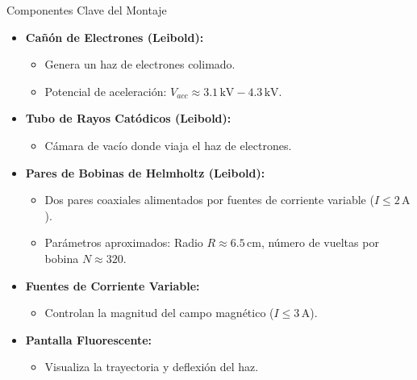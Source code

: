 \documentclass{beamer}
\begin{document}
\begin{frame}{Componentes Clave del Montaje}
  \begin{itemize}
    \item \textbf{Cañón de Electrones (Leibold):}
      \begin{itemize}
        \item Genera un haz de electrones colimado.
        \item Potencial de aceleración: $V_{acc} \approx 3.1 \, \text{kV} - 4.3 \, \text{kV}$.
      \end{itemize}
    \item \textbf{Tubo de Rayos Catódicos (Leibold):}
      \begin{itemize}
        \item Cámara de vacío donde viaja el haz de electrones.
      \end{itemize}
    \item \textbf{Pares de Bobinas de Helmholtz (Leibold):}
      \begin{itemize}
        \item Dos pares coaxiales alimentados por fuentes de corriente variable ($I \le 2 \, \text{A}$).
        \item Parámetros aproximados: Radio $R \approx 6.5 \, \text{cm}$, número de vueltas por bobina $N \approx 320$.
      \end{itemize}
    \item \textbf{Fuentes de Corriente Variable:}
      \begin{itemize}
        \item Controlan la magnitud del campo magnético ($I \le 3 \, \text{A}$).
      \end{itemize}
    \item \textbf{Pantalla Fluorescente:}
      \begin{itemize}
        \item Visualiza la trayectoria y deflexión del haz.
      \end{itemize}
  \end{itemize}
\end{frame}
\end{document}
